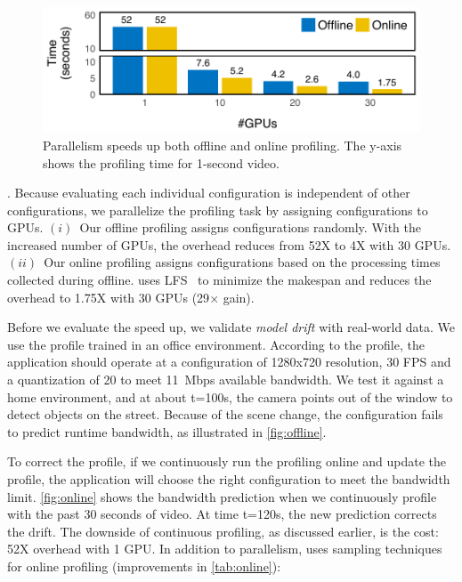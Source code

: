 \begin{figure}
  \centering
  \includegraphics[width=1.0\columnwidth]{figures/parallel.pdf}
  \caption{Parallelism speeds up both offline and online profiling.
  The y-axis shows the profiling time for 1-second video.}
  \label{fig:parallel}
  \vspace{-1em}
\end{figure}

. Because
evaluating each individual configuration is independent of other configurations,
we parallelize the profiling task by assigning configurations to GPUs.
$(i)$~Our offline profiling assigns configurations randomly.  With the increased
number of GPUs, the overhead reduces from 52X to 4X with 30 GPUs.  $(ii)$~Our
online profiling assigns configurations based on the processing times collected
during offline.  \sysname{} uses LFS~\cite{karger2010scheduling} to minimize the
makespan and reduces the overhead to 1.75X with 30 GPUs (29$\times$ gain).

Before we evaluate the speed up, we validate \textit{model drift} with
real-world data. We use the profile trained in an office environment.  According
to the profile, the application should operate at a configuration of 1280x720
resolution, 30 FPS and a quantization of 20 to meet \SI{11}{Mbps} available
bandwidth.  We test it against a home environment, and at about t=100s, the
camera points out of the window to detect objects on the street. Because of the
scene change, the configuration fails to predict runtime bandwidth, as
illustrated in \autoref{fig:offline}.

To correct the profile, if we continuously run the profiling online and update
the profile, the application will choose the right configuration to meet the
bandwidth limit.  \autoref{fig:online} shows the bandwidth prediction when we
continuously profile with the past 30 seconds of video. At time t=120s, the new
prediction corrects the drift. The downside of continuous profiling, as
discussed earlier, is the cost: 52X overhead with 1 GPU\@. In addition to
parallelism, \sysname{} uses sampling techniques for online profiling
(improvements in \autoref{tab:online}):

